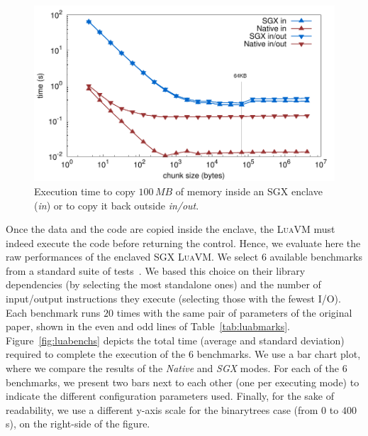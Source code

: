 \begin{figure}[t!]
  \centering
  \includegraphics[width=\linewidth]{plots/memcpy/memcpy}
  \caption{Execution time to copy $100\,MB$ of memory inside an SGX enclave (\emph{in}) or to copy it back outside {\emph{in/out}.} }
  \label{fig:sgxmemcpy}
\end{figure}

Once the data and the code are copied inside the enclave, the \textsc{LuaVM} must indeed execute the code before returning the control.
Hence, we evaluate here the raw performances of the enclaved SGX \textsc{LuaVM}.
We select $6$ available benchmarks from a standard suite of tests~\cite{bolz2015}.
We based this choice on their library dependencies (by selecting the most standalone ones) and the number of input/output instructions they execute (selecting those with the fewest I/O).
Each benchmark runs $20$ times with the same pair of parameters of the original paper, shown in the even and odd lines of Table~\ref{tab:luabmarks}.
Figure~\ref{fig:luabenchs} depicts the total time (average and standard deviation) required to complete the execution of the $6$ benchmarks.
We use a bar chart plot, where we compare the results of the \emph{Native} and \emph{SGX} modes.
For each of the $6$ benchmarks, we present two bars next to each other (one per executing mode) to indicate the different configuration parameters used.
Finally, for the sake of readability, we use a different y-axis scale for the \textsf{binarytrees} case (from $0$ to $400$\,s), on the right-side of the figure.


